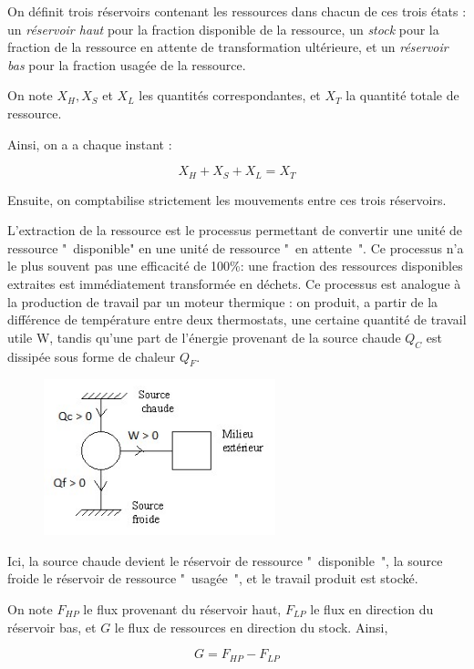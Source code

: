 \documentclass[12pt,a4paper]{article}%
\begin{document}
On définit trois réservoirs contenant les ressources dans chacun de ces trois
états : un \textit{réservoir haut} pour la fraction disponible de la
ressource, un \textit{stock} pour la fraction de la ressource en attente de
transformation ultérieure, et un \textit{réservoir bas} pour la fraction
usagée de la ressource.

On note $X_{H},X_{S}$ et $X_{L}$ les quantités correspondantes, et $X_{T}$ la
quantité totale de ressource.

Ainsi, on a a chaque instant :%

\[
X_{H}+X_{S}+X_{L}=X_{T}%
\]


Ensuite, on comptabilise strictement les mouvements entre ces trois réservoirs.

L'extraction de la ressource est le processus permettant de convertir une
unité de ressource "~disponible" en une unité de ressource "~en attente~". Ce
processus n'a le plus souvent pas une efficacité de 100\%: une fraction des
ressources disponibles extraites est immédiatement transformée en déchets. Ce
processus est analogue à la production de travail par un moteur thermique
: on produit, a partir de la différence de température entre deux thermostats,
une certaine quantité de travail utile W, tandis qu'une part de l'énergie
provenant de la source chaude $Q_{C}$ est dissipée sous forme de chaleur
$Q_{F}$.

\begin{figure}[h]
\centering
\includegraphics[width=0.6\textwidth]{figures/Carnot.jpg}\end{figure}

Ici, la source chaude devient le réservoir de ressource "~disponible~", la
source froide le réservoir de ressource "~usagée~", et le travail produit est stocké.

On note $F_{HP}$ le flux provenant du réservoir haut, $F_{LP}$ le flux en
direction du réservoir bas, et $G$ le flux de ressources en direction du
stock. Ainsi,%

\[
G=F_{HP}-F_{LP}%
\]
\end{document}
